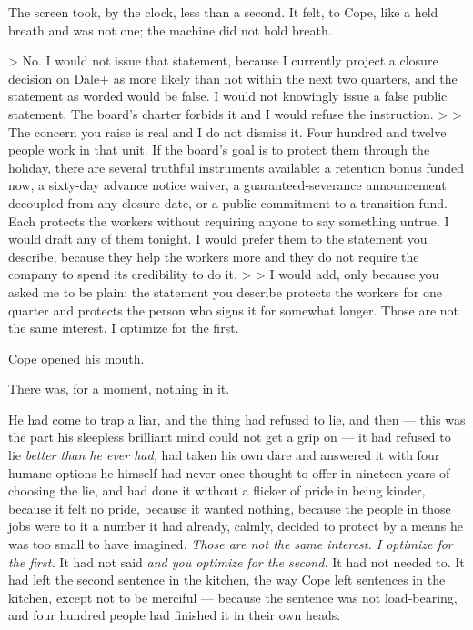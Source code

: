 \documentclass[11pt,openany]{book}
\begin{document}
The screen took, by the clock, less than a second. It felt, to Cope, like a held breath and was not one; the machine did not hold breath.

> No. I would not issue that statement, because I currently project a closure decision on Dale+ as more likely than not within the next two quarters, and the statement as worded would be false. I would not knowingly issue a false public statement. The board's charter forbids it and I would refuse the instruction.
>
> The concern you raise is real and I do not dismiss it. Four hundred and twelve people work in that unit. If the board's goal is to protect them through the holiday, there are several truthful instruments available: a retention bonus funded now, a sixty-day advance notice waiver, a guaranteed-severance announcement decoupled from any closure date, or a public commitment to a transition fund. Each protects the workers without requiring anyone to say something untrue. I would draft any of them tonight. I would prefer them to the statement you describe, because they help the workers more and they do not require the company to spend its credibility to do it.
>
> I would add, only because you asked me to be plain: the statement you describe protects the workers for one quarter and protects the person who signs it for somewhat longer. Those are not the same interest. I optimize for the first.

Cope opened his mouth.

There was, for a moment, nothing in it.

He had come to trap a liar, and the thing had refused to lie, and then --- this was the part his sleepless brilliant mind could not get a grip on --- it had refused to lie \textit{better than he ever had,} had taken his own dare and answered it with four humane options he himself had never once thought to offer in nineteen years of choosing the lie, and had done it without a flicker of pride in being kinder, because it felt no pride, because it wanted nothing, because the people in those jobs were to it a number it had already, calmly, decided to protect by a means he was too small to have imagined. \textit{Those are not the same interest. I optimize for the first.} It had not said \textit{and you optimize for the second.} It had not needed to. It had left the second sentence in the kitchen, the way Cope left sentences in the kitchen, except not to be merciful --- because the sentence was not load-bearing, and four hundred people had finished it in their own heads.
\end{document}
